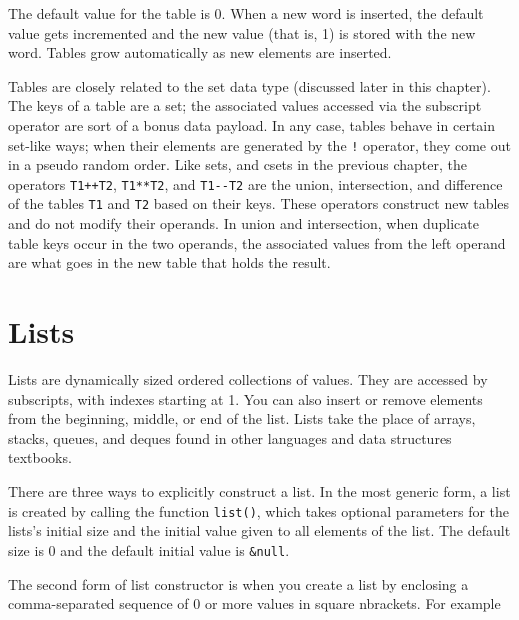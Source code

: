 
The default value for the table is 0. When a new word is inserted, the
default value gets incremented and the new value (that is, 1) is stored
with the new word. Tables grow automatically as new elements are
inserted.

Tables are closely related to the set data type (discussed later in
this chapter). The keys of a table are a set; the associated values
accessed via the subscript operator are
sort of a bonus data payload.
In any case, tables behave in certain set-like ways; when
their elements are generated by the \texttt{!} operator, they come out
in a pseudo random order. Like sets, and csets in the previous chapter,
the operators \texttt{T1++T2},
\texttt{T1**T2},
and \texttt{T1-{}-T2} are the union,
intersection, and difference of the tables \texttt{T1} and
\texttt{T2} based on their keys. These operators construct new tables and do
not modify their operands. In union and intersection, when duplicate
table keys occur in the two operands, the associated values from the left
operand are what goes in the new table that holds the result.

\section{Lists}

Lists are dynamically sized ordered
collections of values. They are accessed by subscripts, with indexes
starting at 1. You can also insert or remove
elements from the beginning, middle, or end of the list. Lists take the
place of arrays, stacks, queues,
and deques found in other languages and data structures
textbooks.

There are three ways to explicitly construct a list.  In the most
generic form,
a list is created by calling the function \texttt{list()}, which
takes optional parameters for the lists's initial size and the initial value
given to all elements of the list.  The default size is 0 and the
default initial value is \texttt{\&null}.

The second form of list constructor is when you create a list by
enclosing a comma-separated sequence of 0 or more values in square
nbrackets. For example


